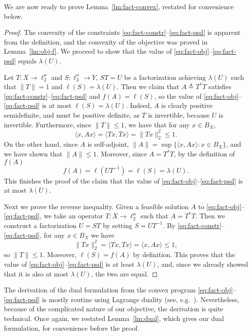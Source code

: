\documentclass[11pt]{article}
\newcommand{\eqdef}{\triangleq}
\begin{document}
We are now ready to prove Lemma~\ref{lm:fact-convex}, restated for
convenience below.
\factconvex*
\begin{proof}%
  The convexity of the constraints
  \eqref{eq:fact-constr}--\eqref{eq:fact-psd} is apparent from the
  definition, and the convexity of the objective was proved in
  Lemma~\ref{lm:obj-f}. We proceed to show that the value of
  \eqref{eq:fact-obj}--\eqref{eq:fact-psd} equals $\lambda(U)$.

  Let $T:X \to \ell_2^n$ and $S:\ell_2^n \to Y$, $ST = U$ be a
  factorization achieving $\lambda(U)$ such that $\|T\| = 1$ and
  $\ell(S) = \lambda(U)$. Then we claim that $A \eqdef T^*T$ satisfies
  \eqref{eq:fact-constr}--\eqref{eq:fact-psd} and $f(A) = \ell(S) $,
  so the value of \eqref{eq:fact-obj}--\eqref{eq:fact-psd} is at most
  $\ell(S) = \lambda(U)$. Indeed, $A$ is clearly positive
  semidefinite, and must be positive definite, as $T$ is invertible,
  because $U$ is invertible. Furthermore, since $\|T\|\le 1$, we have
  that for any $x \in B_X$,
  \[\langle x, Ax \rangle = \langle Tx, Tx\rangle =
  \|Tx\|^2_2 \le 1.\] On the other hand, since $A$ is self-adjoint,
  $\|A\| = \sup\{\langle x, Ax\rangle: x \in B_X\}$, and we have shown
  that $\|A\| \le 1$. Moreover, since $A = T^* T$, by the definition
  of $f(A)$
  \[
  f(A) = \ell(UT^{-1}) = \ell(S) = \lambda(U).
  \]
  This finishes the proof of the claim that the value of
  \eqref{eq:fact-obj}--\eqref{eq:fact-psd} is at most $\lambda(U)$.
  
  Next we prove the reverse inequality. Given a feasible solution $A$
  to \eqref{eq:fact-obj}--\eqref{eq:fact-psd}, we take an operator
  $T:X \to \ell_2^n$ such that $A = T^* T$. Then we construct a
  factorization $U=ST$ by setting $S = UT^{-1}$.  By
  \eqref{eq:fact-constr}--\eqref{eq:fact-psd}, for any $x \in B_X$ we
  have
  \[
  \|Tx\|^2_2 = \langle Tx, Tx\rangle = \langle x, Ax \rangle  \le
  1,\] so $\|T\| \le 1$. Moreover, $\ell(S) = f(A)$ by
  definition. This proves that the value of
  \eqref{eq:fact-obj}--\eqref{eq:fact-psd} is at least
  $\lambda(U)$, and, since we already showed that it is also at
  most $\lambda(U)$, the two are equal.
\end{proof}

The derivation of the dual formulation from the
convex program \eqref{eq:fact-obj}--\eqref{eq:fact-psd} is mostly
routine using Lagrange duality (see,
e.g.~\cite{BoydV04}). Nevertheless, because of the complicated nature
of our objective, the derivation is quite technical. Once again, we
restated Lemma~\ref{lm:dual}, which gives our dual formulation, for
convenience before the proof. 
\end{document}
